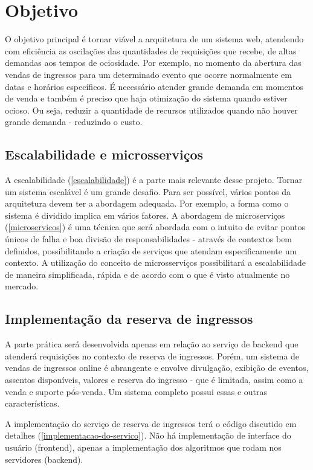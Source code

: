 \chapter{Objetivo}

O objetivo principal é tornar viável a arquitetura de um sistema web, atendendo com eficiência
as oscilações das quantidades de requisições que recebe, de altas demandas aos tempos de ociosidade.
Por exemplo, no momento da abertura das vendas de ingressos para um determinado evento
que ocorre normalmente em datas e horários específicos. É necessário atender grande demanda
em momentos de venda e também é preciso que haja otimização do sistema quando estiver ocioso.
Ou seja, reduzir a quantidade de recursos utilizados quando não houver
grande demanda - reduzindo o custo.

\section{Escalabilidade e microsserviços}
A escalabilidade (\autoref{escalabilidade}) é a parte mais relevante desse projeto.
Tornar um sistema escalável é um grande desafio.
Para ser possível, vários pontos da arquitetura devem ter a
abordagem adequada. Por exemplo, a forma como o sistema é dividido implica em vários
fatores.
A abordagem de microserviços (\autoref{microservicos}) é uma técnica que será abordada
com o intuito de evitar pontos únicos de falha e boa divisão de responsabilidades
- através de contextos bem definidos, possibilitando a criação de serviços que
atendam especificamente um contexto.
A utilização do conceito de microsserviços possibilitará a escalabilidade de maneira
simplificada, rápida e de acordo com o que é visto atualmente no mercado.

\section{Implementação da reserva de ingressos}

A parte prática será desenvolvida apenas em relação ao serviço de backend que
atenderá requisições no contexto de reserva de ingressos.
Porém, um sistema de vendas de ingressos online é abrangente e envolve divulgação,
exibição de eventos, assentos disponíveis, valores e reserva do ingresso -
que é limitada, assim como a venda e suporte pós-venda. Um sistema completo possui essas
e outras características.

A implementação do serviço de reserva de ingressos terá o código discutido
em detalhes (\autoref{implementacao-do-servico}). Não há implementação
de interface do usuário (frontend), apenas a implementação dos algoritmos
que rodam nos servidores (backend).

